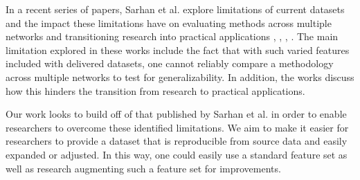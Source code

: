 \documentclass[sigconf]{acmart}
\begin{document}
In a recent series of papers, Sarhan et al. explore limitations of current datasets and the impact these limitations have on evaluating methods across multiple networks and transitioning research into practical applications \cite{sarhan2020netflow}, \cite{sarhan2021cyber}, \cite{Sarhan2021}, \cite{sarhan_arxiv2021}.
The main limitation explored in these works include the fact that with such varied features included with delivered datasets, one cannot reliably compare a methodology across multiple networks to test for generalizability.
In addition, the works discuss how this hinders the transition from research to practical applications. 

Our work looks to build off of that published by Sarhan et al. in order to enable researchers to overcome these identified limitations.
We aim to make it easier for researchers to provide a dataset that is reproducible from source data and easily expanded or adjusted.
In this way, one could easily use a standard feature set as well as research augmenting such a feature set for improvements.
\end{document}
